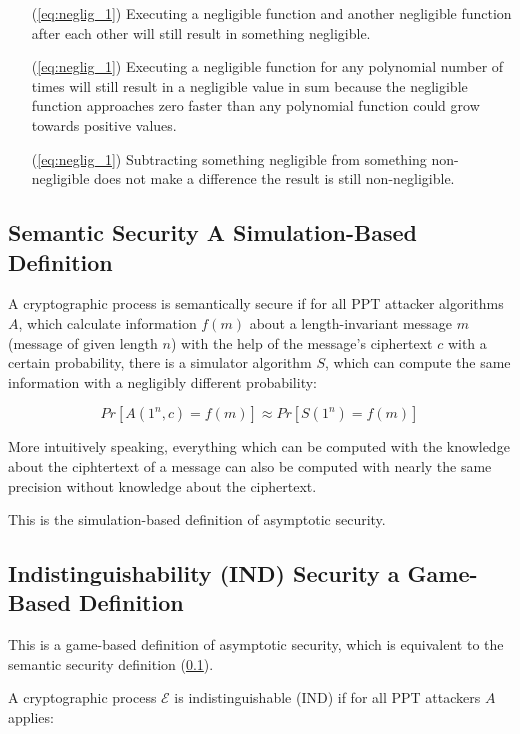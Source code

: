 \begin{enumerate}
    \item[(\ref{eq:neglig_1})] Executing a negligible function and another negligible function after each other will still result in something negligible.
    \item[(\ref{eq:neglig_1})] Executing a negligible function for any polynomial number of times will still result in a negligible value in sum because the negligible function approaches zero faster than any polynomial function could grow towards positive values.
    \item[(\ref{eq:neglig_1})] Subtracting something negligible from something non-negligible does not make a difference \textendash{} the result is still non-negligible.
\end{enumerate}

\subsection{Semantic Security \textendash{} A Simulation-Based Definition}
\label{sec:semantic_securits}

A cryptographic process is semantically secure if for all PPT attacker algorithms $A$, which calculate information $f(m)$ about a length-invariant message $m$ (message of given length $n$) with the help of the message's ciphertext $c$ with a certain probability, there is a simulator algorithm $S$, which can compute the same information with a negligibly different probability:

$$
    Pr[A(1^{n},c) = f(m)] \approx Pr[S(1^{n}) = f(m)]
$$

More intuitively speaking, everything which can be computed with the knowledge about the ciphtertext of a message can also be computed with nearly the same precision without knowledge about the ciphertext.

This is the simulation-based definition of asymptotic security.

\subsection[Indistinguishability (IND) \textendash{} a Game-Based Definition]{Indistinguishability (IND) Security \textendash{} a Game-Based Definition}

This is a game-based definition of asymptotic security, which is equivalent to the semantic security definition (\ref{sec:semantic_securits}).

A cryptographic process $\mathcal{E}$ is indistinguishable (IND) if for all PPT attackers $A$ applies:


